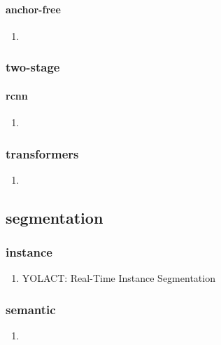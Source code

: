 \documentclass[acmlarge]{acmart}
\begin{document}
			\paragraph{anchor-free}
			\begin{enumerate}
				\item
			\end{enumerate}
		\begin{enumerate}
		\end{enumerate}
		\subsubsection{two-stage}
			\paragraph{rcnn}
			\begin{enumerate}
				\item
			\end{enumerate}
		\begin{enumerate}
		\end{enumerate}
		\subsubsection{transformers}
		\begin{enumerate}
			\item
		\end{enumerate}
	\begin{enumerate}
	\end{enumerate}
	\subsection{segmentation}
		\subsubsection{instance}
		\begin{enumerate}
			\item YOLACT: Real-Time Instance Segmentation \cite{Bolya2019YOLACTRI} 

		\end{enumerate}
		\subsubsection{semantic}
		\begin{enumerate}
			\item
		\end{enumerate}
\end{document}
